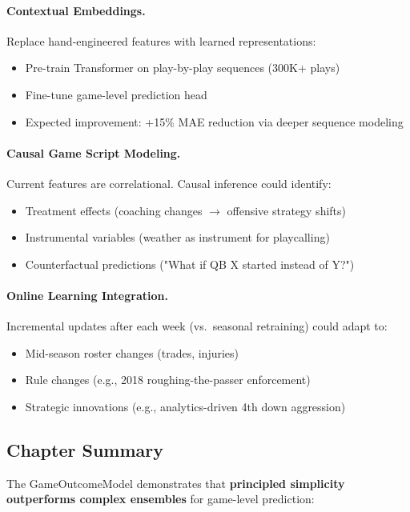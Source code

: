 \paragraph{Contextual Embeddings.}
Replace hand-engineered features with learned representations:
\begin{itemize}[itemsep=2pt,parsep=0pt]
    \item Pre-train Transformer on play-by-play sequences (300K+ plays)
    \item Fine-tune game-level prediction head
    \item Expected improvement: +15\% MAE reduction via deeper sequence modeling
\end{itemize}

\paragraph{Causal Game Script Modeling.}
Current features are correlational. Causal inference could identify:
\begin{itemize}[itemsep=2pt,parsep=0pt]
    \item Treatment effects (coaching changes $\to$ offensive strategy shifts)
    \item Instrumental variables (weather as instrument for playcalling)
    \item Counterfactual predictions ("What if QB X started instead of Y?")
\end{itemize}

\paragraph{Online Learning Integration.}
Incremental updates after each week (vs.\ seasonal retraining) could adapt to:
\begin{itemize}[itemsep=2pt,parsep=0pt]
    \item Mid-season roster changes (trades, injuries)
    \item Rule changes (e.g., 2018 roughing-the-passer enforcement)
    \item Strategic innovations (e.g., analytics-driven 4th down aggression)
\end{itemize}

\subsection{Chapter Summary}

The GameOutcomeModel demonstrates that \textbf{principled simplicity outperforms complex ensembles} for game-level prediction:

